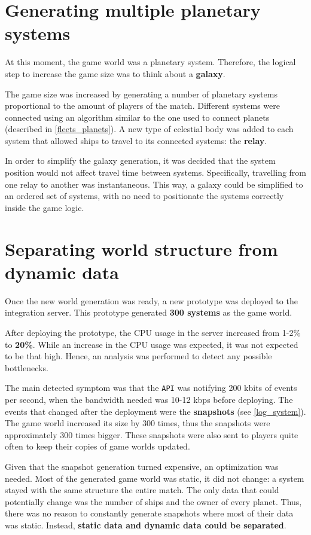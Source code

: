 \documentclass[a4paper,11pt,titlepage,abstract,numbers=noenddot,automark,mnsy,intlimits,rgb,dvipsnames]{report}
\begin{document}
\section{Generating multiple planetary systems}
At this moment, the game world was a planetary system. Therefore, the logical step to increase the game size
was to think about a \textbf{galaxy}.

The game size was increased by generating a number of planetary systems proportional to the amount
of players of the match. Different systems were connected using an algorithm similar to the one used to
connect planets (described in \autoref{fleets_planets}). A new type of celestial body was added to each system that
allowed ships to travel to its connected systems: the \textbf{relay}.

In order to simplify the galaxy generation, it was decided that the system position would not affect travel time between
systems. Specifically, travelling from one relay to another was instantaneous. This way, a galaxy could be simplified
to an ordered set of systems, with no need to positionate the systems correctly inside the game logic.
\section{Separating world structure from dynamic data}
Once the new world generation was ready, a new prototype was deployed to the integration server. This prototype
generated \textbf{300 systems} as the game world.

After deploying the prototype, the CPU usage in the server increased from 1-2\% to \textbf{20\%}. While an increase
in the CPU usage was expected, it was not expected to be that high. Hence, an analysis was performed to detect
any possible bottlenecks.

The main detected symptom was that the \texttt{API} was notifying 200 kbits of events per second, when the bandwidth needed was 10-12 kbps
before deploying. The events that changed after the deployment were the \textbf{snapshots} (see \autoref{log_system}).
The game world increased its size by 300 times, thus the snapshots were approximately 300 times bigger. These snapshots
were also sent to players quite often to keep their copies of game worlds updated.

Given that the snapshot generation turned expensive, an optimization was needed. Most of the generated game world was static,
it did not change: a system stayed with the same structure the entire match. The only data that could potentially change
was the number of ships and the owner of every planet. Thus, there was no reason to constantly generate snapshots where most of
their data was static. Instead, \textbf{static data and dynamic data could be separated}.
\end{document}
